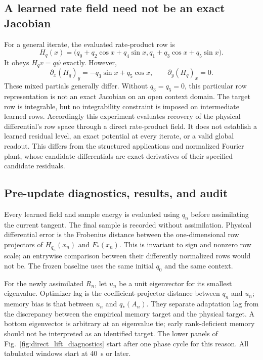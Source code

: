 \subsection{A learned rate field need not be an exact Jacobian}
For a general iterate, the evaluated rate-product row is
\begin{equation}
 H_q(x)=\bigl(q_0+q_2\cos x+q_4\sin x,
                 q_1+q_3\cos x+q_5\sin x\bigr).
\end{equation}
It obeys $H_qv=q\psi$ exactly. However,
\begin{equation}
 \partial_x(H_q)_y=-q_3\sin x+q_5\cos x,
 \qquad \partial_y(H_q)_x=0.
\end{equation}
These mixed partials generally differ. Without $q_3=q_5=0$, this
particular row representation is not an exact Jacobian on an open
context domain. The target row is integrable, but no integrability
constraint is imposed on intermediate learned rows. Accordingly this
experiment evaluates recovery of the physical differential's row space
through a direct rate-product field. It does not establish a learned
residual level, an exact potential at every iterate, or a valid global
readout. This differs from the structured applications and normalized Fourier
plant, whose
candidate differentials are exact derivatives of their specified
candidate residuals.

\subsection{Pre-update diagnostics, results, and audit}
Every learned field and sample energy is evaluated using $q_n$ before
assimilating the current tangent. The final sample is recorded without
assimilation. Physical differential error is the Frobenius distance
between the one-dimensional row projectors of $H_{q_n}(x_n)$ and
$F_*(x_n)$. This is invariant to sign and nonzero row scale; an entrywise
comparison between their differently normalized rows would not be.
The frozen baseline uses the same initial $q_0$ and the same context.

For the newly assimilated $R_n$, let $u_n$ be a unit eigenvector for its
smallest eigenvalue. Optimizer lag is the coefficient-projector distance
between $q_n$ and $u_n$; memory bias is that between $u_n$ and $q_*(A_n)$.
They separate adaptation lag from the discrepancy between the empirical
memory target and the physical target. A bottom eigenvector is arbitrary
at an eigenvalue tie; early rank-deficient memory should not be interpreted
as an identified target. The lower panels of
Fig.~\ref{fig:direct_lift_diagnostics} start after one phase cycle for this
reason. All tabulated windows start at 40~s or later.

